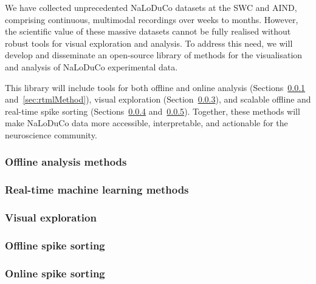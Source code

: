 We have collected unprecedented NaLoDuCo datasets at the SWC and AIND,
comprising continuous, multimodal recordings over weeks to months. However, the
scientific value of these massive datasets cannot be fully realised without
robust tools for visual exploration and analysis. To address this need, we will
develop and disseminate an open-source library of methods for the visualisation
and analysis of NaLoDuCo experimental data.

This library will include tools for both offline and online analysis
(Sections~\ref{sec:offlineAnalysisMethods}
and~\ref{sec:rtmlMethod}), visual exploration
(Section~\ref{sec:visualExploration}), and scalable offline and real-time spike
sorting (Sections~\ref{sec:offlineSpikeSorting}
and~\ref{sec:onlineSpikeSorting}). Together, these methods will make NaLoDuCo
data more accessible, interpretable, and actionable for the neuroscience
community.

\subsubsection{Offline analysis methods}
\label{sec:offlineAnalysisMethods}



\subsubsection{Real-time machine learning methods}
\label{sec:rtmlMethods}



\subsubsection{Visual exploration}
\label{sec:visualExploration}



\subsubsection{Offline spike sorting}
\label{sec:offlineSpikeSorting}



\subsubsection{Online spike sorting}
\label{sec:onlineSpikeSorting}


